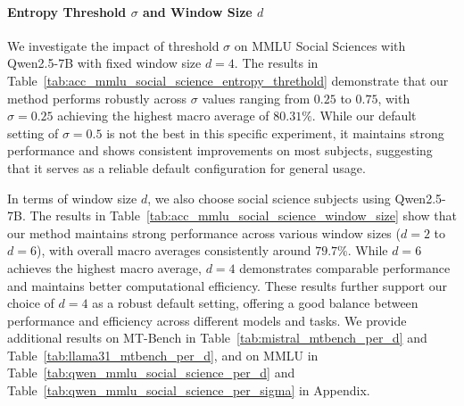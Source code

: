 \paragraph{Entropy Threshold $\sigma$ and Window Size $d$}\label{main:experiments:entropy_window_size}
We investigate the impact of threshold $\sigma$ on MMLU Social Sciences with Qwen2.5-7B with fixed window size $d=4$.
The results in Table~\ref{tab:acc_mmlu_social_science_entropy_threthold} demonstrate that our method performs robustly across $\sigma$ values ranging from $0.25$ to $0.75$, with $\sigma=0.25$ achieving the highest macro average of $80.31\%$.
While our default setting of $\sigma=0.5$ is not the  best in this specific experiment, it maintains strong performance and shows consistent improvements on most subjects, suggesting that it serves as a reliable default configuration for general usage.

In terms of window size $d$, we also choose social science subjects using Qwen2.5-7B.
The results in Table~\ref{tab:acc_mmlu_social_science_window_size} show that our method maintains strong performance across various window sizes ($d=2$ to $d=6$), with overall macro averages consistently around $79.7\%$.
While $d=6$ achieves the highest macro average, $d=4$ demonstrates comparable performance and maintains better computational efficiency.
These results further support our choice of $d=4$ as a robust default setting, offering a good balance between performance and efficiency across different models and tasks.
We provide additional results on MT-Bench in Table~\ref{tab:mistral_mtbench_per_d} and Table~\ref{tab:llama31_mtbench_per_d}, and on MMLU in Table~\ref{tab:qwen_mmlu_social_science_per_d} and Table~\ref{tab:qwen_mmlu_social_science_per_sigma} in Appendix.


